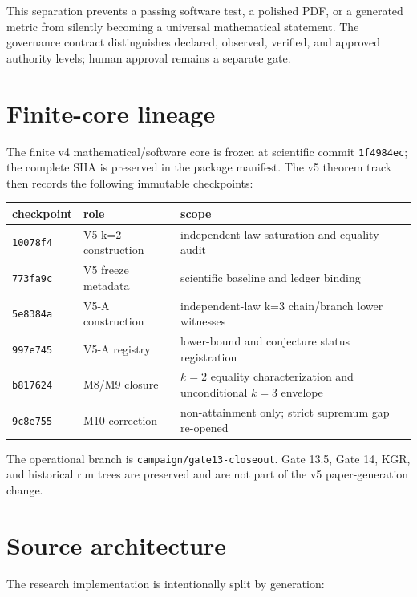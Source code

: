 \documentclass[11pt]{amsart}
\begin{document}
This separation prevents a passing software test, a polished PDF, or a
generated metric from silently becoming a universal mathematical statement.
The governance contract distinguishes declared, observed, verified, and
approved authority levels; human approval remains a separate gate.

\section{Finite-core lineage}

The finite v4 mathematical/software core is frozen at scientific commit
\texttt{1f4984ec}; the complete SHA is preserved in the package manifest. The
v5 theorem track then records the following immutable checkpoints:

\begin{center}
\small
\begin{tabularx}{.97\textwidth}{@{}l l X@{}}
\toprule
checkpoint & role & scope\\
\midrule
\texttt{10078f4} & V5 k=2 construction & independent-law saturation and equality audit\\
\texttt{773fa9c} & V5 freeze metadata & scientific baseline and ledger binding\\
\texttt{5e8384a} & V5-A construction & independent-law k=3 chain/branch lower witnesses\\
\texttt{997e745} & V5-A registry & lower-bound and conjecture status registration\\
\texttt{b817624} & M8/M9 closure & $k=2$ equality characterization and unconditional $k=3$ envelope\\
\texttt{9c8e755} & M10 correction & non-attainment only; strict supremum gap re-opened\\
\bottomrule
\end{tabularx}
\end{center}

The operational branch is \texttt{campaign/gate13-closeout}. Gate 13.5, Gate
14, KGR, and historical run trees are preserved and are not part of the v5
paper-generation change.

\section{Source architecture}

The research implementation is intentionally split by generation:
\end{document}
